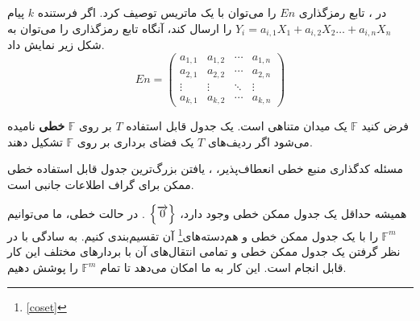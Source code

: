 \begin{note}
    در 
    \lpicod
    ، تابع رمزگذاری 
    $En$
         را می‌توان با یک ماتریس توصیف کرد. اگر فرستنده
    $k$ 
    پیام
     $Y_i = a_{i,1} X_1 + a_{i,2} X_2 \ldots + a_{i,n} X_n$
      را ارسال کند، آنگاه تابع رمزگذاری را می‌توان به شکل زیر نمایش داد.
    \begin{equation*}
        En =
        \begin{pmatrix}
            a_{1,1} & a_{1,2} & \cdots & a_{1,n} \\
            a_{2,1} & a_{2,2} & \cdots & a_{2,n} \\
            \vdots  & \vdots  & \ddots & \vdots  \\
            a_{k,1} & a_{k,2} & \cdots & a_{k,n}
        \end{pmatrix}
    \end{equation*}
\end{note}

\begin{definition}
	\label{def:lineartable}
    فرض کنید 
    $\mathbb{F}$
     یک میدان متناهی است. یک جدول قابل استفاده 
     $T$ 
     بر روی 
     $\mathbb{F}$
      \textbf{
      خطی
    }
       نامیده می‌شود اگر ردیف‌های 
      $T$ 
      یک فضای برداری بر روی 
      $\mathbb{F}$
       تشکیل دهند.
\end{definition}

مسئله کدگذاری منبع خطی انعطاف‌پذیر، 
\lpsicod
، یافتن بزرگ‌ترین جدول قابل استفاده خطی ممکن برای گراف اطلاعات جانبی است.

\begin{remark}
    همیشه حداقل یک جدول ممکن خطی وجود دارد، 
    $\left\{ \overrightarrow{0} \right\}$
    . در حالت خطی، ما می‌توانیم 
    $\mathbb{F}^m$
     را با یک جدول ممکن خطی و هم‌دسته‌های\footnote{\autoref{coset}} آن تقسیم‌بندی کنیم. به سادگی با در نظر گرفتن یک جدول ممکن خطی و تمامی انتقال‌های  آن با بردارهای مختلف این کار قابل انجام است. این کار به ما امکان می‌دهد تا تمام 
     $\mathbb{F}^m$
      را پوشش دهیم.
\end{remark}

